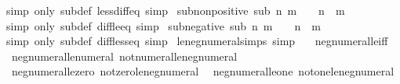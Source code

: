 \begin{isabellebody}
\isamarkupfalse%
\ {\isacharparenleft}{\kern0pt}simp\ only{\isacharcolon}{\kern0pt}\ sub{\isacharunderscore}{\kern0pt}def\ less{\isacharunderscore}{\kern0pt}diff{\isacharunderscore}{\kern0pt}eq{\isacharparenright}{\kern0pt}\ simp%
\endisatagproof
{\isafoldproof}%
%
\isadelimproof
\isanewline
%
\endisadelimproof
\isanewline
{}\isamarkupfalse%
\ sub{\isacharunderscore}{\kern0pt}non{\isacharunderscore}{\kern0pt}positive{\isacharcolon}{\kern0pt}\ {\isachardoublequoteopen}sub\ n\ m\ {\isasymle}\ {}\ {\isasymlongleftrightarrow}\ n\ {\isasymle}\ m{\isachardoublequoteclose}\isanewline
%
\isadelimproof
\ \ %
\endisadelimproof
%
\isatagproof
{}\isamarkupfalse%
\ {\isacharparenleft}{\kern0pt}simp\ only{\isacharcolon}{\kern0pt}\ sub{\isacharunderscore}{\kern0pt}def\ diff{\isacharunderscore}{\kern0pt}le{\isacharunderscore}{\kern0pt}eq{\isacharparenright}{\kern0pt}\ simp%
\endisatagproof
{\isafoldproof}%
%
\isadelimproof
\isanewline
%
\endisadelimproof
\isanewline
{}\isamarkupfalse%
\ sub{\isacharunderscore}{\kern0pt}negative{\isacharcolon}{\kern0pt}\ {\isachardoublequoteopen}sub\ n\ m\ {\isacharless}{\kern0pt}\ {}\ {\isasymlongleftrightarrow}\ n\ {\isacharless}{\kern0pt}\ m{\isachardoublequoteclose}\isanewline
%
\isadelimproof
\ \ %
\endisadelimproof
%
\isatagproof
{}\isamarkupfalse%
\ {\isacharparenleft}{\kern0pt}simp\ only{\isacharcolon}{\kern0pt}\ sub{\isacharunderscore}{\kern0pt}def\ diff{\isacharunderscore}{\kern0pt}less{\isacharunderscore}{\kern0pt}eq{\isacharparenright}{\kern0pt}\ simp%
\endisatagproof
{\isafoldproof}%
%
\isadelimproof
\isanewline
%
\endisadelimproof
\isanewline
{}\isamarkupfalse%
\ le{\isacharunderscore}{\kern0pt}neg{\isacharunderscore}{\kern0pt}numeral{\isacharunderscore}{\kern0pt}simps\ {\isacharbrackleft}{\kern0pt}simp{\isacharbrackright}{\kern0pt}\ {\isacharequal}{\kern0pt}\isanewline
\ \ neg{\isacharunderscore}{\kern0pt}numeral{\isacharunderscore}{\kern0pt}le{\isacharunderscore}{\kern0pt}iff\isanewline
\ \ neg{\isacharunderscore}{\kern0pt}numeral{\isacharunderscore}{\kern0pt}le{\isacharunderscore}{\kern0pt}numeral\ not{\isacharunderscore}{\kern0pt}numeral{\isacharunderscore}{\kern0pt}le{\isacharunderscore}{\kern0pt}neg{\isacharunderscore}{\kern0pt}numeral\isanewline
\ \ neg{\isacharunderscore}{\kern0pt}numeral{\isacharunderscore}{\kern0pt}le{\isacharunderscore}{\kern0pt}zero\ not{\isacharunderscore}{\kern0pt}zero{\isacharunderscore}{\kern0pt}le{\isacharunderscore}{\kern0pt}neg{\isacharunderscore}{\kern0pt}numeral\isanewline
\ \ neg{\isacharunderscore}{\kern0pt}numeral{\isacharunderscore}{\kern0pt}le{\isacharunderscore}{\kern0pt}one\ not{\isacharunderscore}{\kern0pt}one{\isacharunderscore}{\kern0pt}le{\isacharunderscore}{\kern0pt}neg{\isacharunderscore}{\kern0pt}numeral\isanewline

\end{isabellebody}
